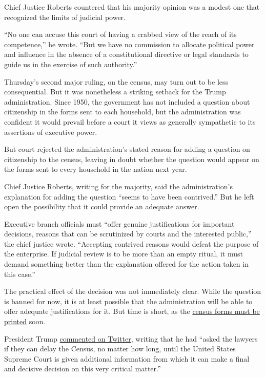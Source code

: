 Chief Justice Roberts countered that his majority opinion was a modest
one that recognized the limits of judicial power.

``No one can accuse this court of having a crabbed view of the reach of
its competence,'' he wrote. ``But we have no commission to allocate
political power and influence in the absence of a constitutional
directive or legal standards to guide us in the exercise of such
authority.''

Thursday's second major ruling, on the census, may turn out to be less
consequential. But it was nonetheless a striking setback for the Trump
administration. Since 1950, the government has not included a question
about citizenship in the forms sent to each household, but the
administration was confident it would prevail before a court it views as
generally sympathetic to its assertions of executive power.

But court rejected the administration's stated reason for adding a
question on citizenship to the census, leaving in doubt whether the
question would appear on the forms sent to every household in the nation
next year.

Chief Justice Roberts, writing for the majority, said the
administration's explanation for adding the question ``seems to have
been contrived.'' But he left open the possibility that it could provide
an adequate answer.

Executive branch officials must ``offer genuine justifications for
important decisions, reasons that can be scrutinized by courts and the
interested public,'' the chief justice wrote. ``Accepting contrived
reasons would defeat the purpose of the enterprise. If judicial review
is to be more than an empty ritual, it must demand something better than
the explanation offered for the action taken in this case.''

The practical effect of the decision was not immediately clear. While
the question is banned for now, it is at least possible that the
administration will be able to offer adequate justifications for it. But
time is short, as the
\href{https://www.nytimes3xbfgragh.onion/2019/06/27/us/census-printing.html}{census
forms must be printed} soon.

President Trump
\href{https://twitter.com/realDonaldTrump/status/1144298731887628288}{commented
on Twitter}, writing that he had ``asked the lawyers if they can delay
the Census, no matter how long, until the United States Supreme Court is
given additional information from which it can make a final and decisive
decision on this very critical matter.''

